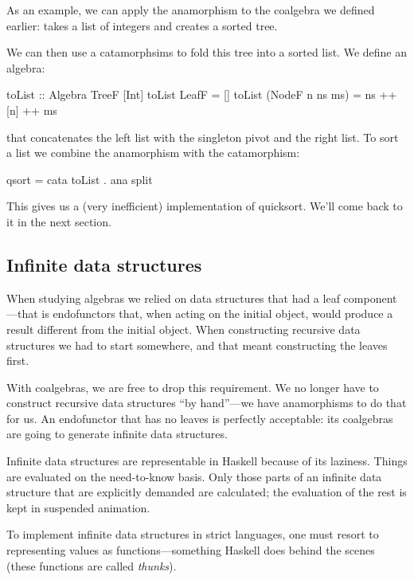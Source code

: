 \documentclass[DaoFP]{subfiles}
\begin{document}
As an example, we can apply the anamorphism to the  coalgebra we defined earlier:  takes a list of integers and creates a sorted tree. 

We can then use a catamorphsims to fold this tree into a sorted list. We define an algebra:
\begin{haskell}
toList :: Algebra TreeF [Int]
toList LeafF = []
toList (NodeF n ns ms) = ns ++ [n] ++ ms
\end{haskell}
that concatenates the left list with the singleton pivot and the right list. To sort a list we combine the anamorphism with the catamorphism:
\begin{haskell}
qsort = cata toList . ana split
\end{haskell}
This gives us a (very inefficient) implementation of quicksort. We'll come back to it in the next section.

\subsection{Infinite data structures}

When studying algebras we relied on data structures that had a leaf component---that is endofunctors that, when acting on the initial object, would produce a result different from the initial object. When constructing recursive data structures we had to start somewhere, and that meant constructing the leaves first.

With coalgebras, we are free to drop this requirement. We no longer have to construct recursive data structures ``by hand''---we have anamorphisms to do that for us. An endofunctor that has no leaves is perfectly acceptable: its coalgebras are going to generate infinite data structures. 

Infinite data structures are representable in Haskell because of its laziness. Things are evaluated on the need-to-know basis. Only those parts of an infinite data structure that are explicitly demanded are calculated; the evaluation of the rest is kept in suspended animation. 

To implement infinite data structures in strict languages, one must resort to representing values as functions---something Haskell does behind the scenes (these functions are called \emph{thunks}).
\end{document}

